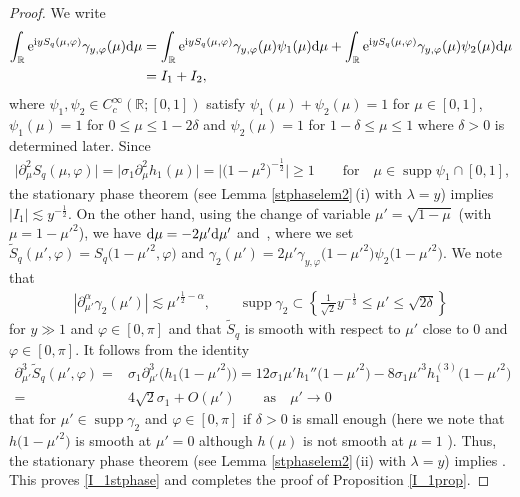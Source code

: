\documentclass[10pt,a4paper]{amsart}
\numberwithin{equation}{section}
\def\R{\mathbb{R}}%
\def\d{\,\mathrm{d}}%
\DeclareMathOperator{\supp}{supp}%
\def\a{\alpha}
\def\c{\gamma}
\def\d{\delta}
\def\f{\varphi}
\def\g{\psi}
\def\l{\lambda}
\def\m{\mu}
\def\s{\sigma}
\def\pa{\partial}
\begin{document}
\begin{proof}
We write
\begin{align*}
\int_{\R}{\rm e}^{{\rm i}yS_q(\m,\f) }\c_{y,\f}(\m){\rm d}\m&=\int_{\R}{\rm e}^{{\rm i}yS_q(\m,\f) }\c_{y,\f}(\m)\g_1(\m){\rm d}\m+\int_{\R}{\rm e}^{{\rm i}yS_q(\m,\f) }\c_{y,\f}(\m)\g_2(\m){\rm d}\m\\
&=I_1+I_2,
\end{align*}
where $\g_1,\g_2\in C_c^{\infty}(\R;[0,1])$ satisfy $\g_1(\m)+\g_2(\m)=1$ for $\m\in [0,1]$, $\g_1(\m)=1$ for $0\leq \m\leq 1-2\d$ and $\g_2(\m)=1$ for $1-\d\leq \m\leq 1$ where $\d>0$ is determined later.
Since
\begin{align*}
\big|\pa_{\m}^2S_{q}(\m,\f)\big|=\big|\s_1\pa_{\m}^2h_1(\m)\big|=\big|\bigl(1-\m^2\bigr)^{-\frac{1}{2}}\big|\ge 1\qquad \text{for}\quad \m\in \supp \g_1\cap[0,1],
\end{align*}
the stationary phase theorem (see Lemma \ref{stphaselem2}\,(i) with $\l=y$) implies $|I_1|\lesssim y^{-\frac{1}{2}}$.
On the other hand, using the change of variable $\m'=\sqrt{1-\m}$ (with $\m=1-\m'^2$), we have ${\rm d}\m=-2\m'{\rm d}\m'$ and~\smash{$
I_2=\int_{\R}{\rm e}^{{\rm i}y\tilde{S}_q(\m',\f) }\c_2(\m'){\rm d}\m'$},
where we set $\tilde{S}_q(\m',\f)=S_q\bigl(1-\m'^2,\f\bigr)$ and $\c_2(\m')=2\m'\c_{y,\f}\bigl(1-\m'^2\bigr)\g_2\bigl(1-\m'^2\bigr)$. We note that
\begin{align*}
|\pa_{\m'}^{\a}\c_2(\m')|\lesssim\m'^{\frac{1}{2}-\a},\qquad\supp\c_2\subset \left\{ \frac{1}{\sqrt{2}}y^{-\frac{1}{3}}\leq \m'\leq \sqrt{2\d}\right\}
\end{align*}
for $y\gg 1$ and $\f\in [0,\pi]$ and that $\tilde{S}_q$ is smooth with respect to $\m'$ close to $0$ and $\f\in[0,\pi]$.
It follows from the identity
\begin{align*}
\pa_{\m'}^3\tilde{S}_q(\m',\f)={}&\s_1\pa_{\m'}^3\bigl(h_1\bigl(1-\m'^2\bigr)\bigr)=12\s_1\m' h_1''\bigl(1-\m'^2\bigr)-8\s_1\m'^3h_1^{(3)}\bigl(1-\m'^2\bigr)\\
={}&4\sqrt{2}\s_1+O(\m')\qquad \text{as}\quad \m'\to 0
\end{align*}
that \smash{$\big|\pa_{\m'}^3\tilde{S}_{q}(\m',\f)\big|\gtrsim 1$} for $\m'\in \supp \c_2$ and $\f\in [0,\pi]$ if $\d>0$ is small enough (here we note that~${h\bigl(1-\m'^2\bigr)}$ is smooth at $\m'=0$ although $h(\m)$ is not smooth at $\m=1$ ). Thus, the stationary phase theorem (see Lemma \ref{stphaselem2}\,(ii) with $\l=y$) implies
.
This proves \eqref{I_1stphase} and completes the proof of Proposition \ref{I_1prop}.
\end{proof}
\end{document}
